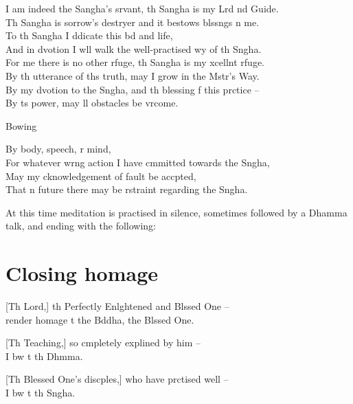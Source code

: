 I am indeed the Sangha's srvant, th Sangha is my Lrd nd Guide.\\%
Th Sangha is sorrow's destryer and it bestows blssngs n me.\\
To th Sangha I ddicate this bd and life,\\
And in dvotion I wll walk the well-practised wy of th Sngha.\\
For me there is no other rfuge, th Sangha is my xcellnt rfuge.\\
By th utterance of ths truth, may I grow in the Mstr's Way.\\
By my dvotion to the Sngha, and th blessing f this prctice --\\
By ts power, may ll obstacles be vrcome.

\begin{instruction}
  Bowing
\end{instruction}

By body, speech, r mind,\\
For whatever wrng action I have cmmitted towards the Sngha,\\
May my cknowledgement of fault be accpted,\\
That n future there may be rstraint regarding the Sngha.

\begin{instruction}
  At this time meditation is practised in silence, sometimes followed by a Dhamma talk, and ending with the following:
\end{instruction}

\chapter{Closing homage}%

[Th Lord,] th Perfectly Enlghtened and Blssed One --\\
 render homage t the Bddha, the Blssed One. 

[Th Teaching,] so cmpletely explined by him --\\
I bw t th Dhmma. 

[Th Blessed One's discples,] who have prctised well --\\
I bw t th Sngha. 


